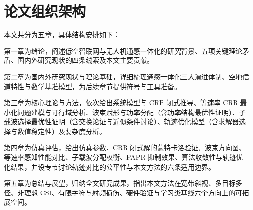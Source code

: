 \section{论文组织架构}
\label{sec:organization}

本文共分为五章，具体结构安排如下：

第一章为绪论，阐述低空智联网与无人机通感一体化的研究背景、五项关键理论矛盾、国内外研究现状的四条线索及本文主要贡献。

第二章为国内外研究现状与理论基础，详细梳理通感一体化三大演进体制、空地信道特性与数学基准模型，为后续章节提供符号与工具准备。

第三章为核心理论与方法，依次给出系统模型与 CRB 闭式推导、等速率 CRB 最小化问题建模与可行域分析、波束赋形与功率分配（含功率结构最优性证明）、子载波选择最优性证明（含交换论证与近似条件讨论）、轨迹优化模型（含求解器选择与数值稳定性）及复杂度分析。

第四章为仿真评估，给出仿真参数、CRB 闭式解的蒙特卡洛验证、波束方向图、等速率感知性能对比、子载波分配权衡、PAPR 抑制效果、算法收敛性与轨迹优化结果，并设专节讨论轨迹对比的公平性与本文方法的六条适用边界。

第五章为总结与展望，归纳全文研究成果，指出本文方法在宽带斜视、多目标多径、非理想 CSI、有限字符与射频损伤、硬件验证与学习类基线六个方向上的可拓展空间。
